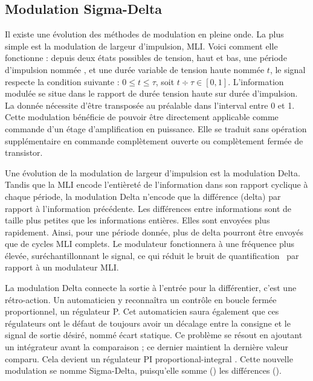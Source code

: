 \documentclass[10pt, oneside, a4paper]{article}
\begin{document}
\subsection{Modulation Sigma-Delta}
\label{sec:sigmaDelta}
Il existe une évolution des méthodes de modulation en pleine onde.
La plus simple est la modulation de largeur d'impulsion, MLI.
Voici comment elle fonctionne : depuis deux états possibles de tension, haut et bas, une période d'impulsion nommée \tau{}, et une durée variable de tension haute nommée $t$, le signal respecte la condition suivante : $0 \leq t \leq \tau $, soit $t \div \tau \in [0,1]$.
L'information modulée se situe dans le rapport de durée tension haute sur durée d'impulsion.
La donnée nécessite d'être transposée au préalable dans l'interval entre 0 et 1.
Cette modulation bénéficie de pouvoir être directement applicable comme commande d'un étage d'amplification en puissance.
Elle se traduit sans opération supplémentaire en commande complètement ouverte ou complètement fermée de transistor.

Une évolution de la modulation de largeur d'impulsion est la modulation Delta.
Tandis que la MLI encode l'entièreté de l'information dans son rapport cyclique à chaque période, la modulation Delta n'encode que la différence (delta) par rapport à l'information précédente.
Les différences entre informations sont de taille plus petites que les informations entières.
Elles sont envoyées plus rapidement.
Ainsi, pour une période donnée, plus de delta pourront être envoyés que de cycles MLI complets.
Le modulateur fonctionnera à une fréquence plus élevée, suréchantillonnant le signal, ce qui réduit le bruit de quantification~\cite{gray1998quantization} par rapport à un modulateur MLI.

La modulation Delta connecte la sortie à l'entrée pour la différentier, c'est une rétro-action.
Un automaticien y reconnaîtra un contrôle en boucle fermée proportionnel, un régulateur P.
Cet automaticien saura également que ces régulateurs ont le défaut de toujours avoir un décalage entre la consigne et le signal de sortie désiré, nommé \og{}écart statique\fg{}.
Ce problème se résout en ajoutant un intégrateur avant la comparaison ; ce dernier maintient la dernière valeur comparu.
Cela devient un régulateur PI \og{}proportional-integral \fg{}.
Cette nouvelle modulation se nomme Sigma-Delta, puisqu'elle somme (\Sigma{}) les différences (\Delta{}).
\end{document}
